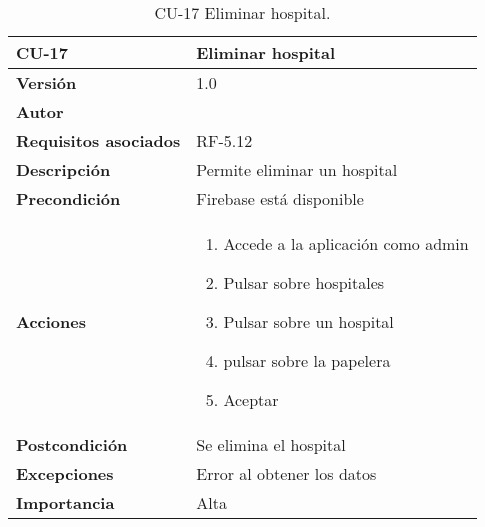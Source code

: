 \begin{table}[p]
	\centering
	\begin{tabularx}{\linewidth}{ p{} p{} }
		\toprule
		\textbf{CU-17}    & \textbf{Eliminar hospital}\\
		\toprule
		\textbf{Versión}              & 1.0    \\
		\textbf{Autor}                & {\nombre} \\
		\textbf{Requisitos asociados} & RF-5.12 \\
		\textbf{Descripción}          & Permite eliminar un hospital \\
		\textbf{Precondición}         & Firebase está disponible \\
		\textbf{Acciones}             &
		\begin{enumerate}
			\def\labelenumi{\arabic{enumi}.}
			\tightlist
			\item Accede a la aplicación como admin
			\item Pulsar sobre hospitales
			\item Pulsar sobre un hospital
			\item pulsar sobre la papelera
			\item Aceptar
		\end{enumerate}\\
		\textbf{Postcondición}        & Se elimina el hospital\\
		\textbf{Excepciones}          & Error al obtener los datos \\
		\textbf{Importancia}          & Alta \\
		\bottomrule
	\end{tabularx}
	\caption{CU-17 Eliminar hospital.}
\end{table}

